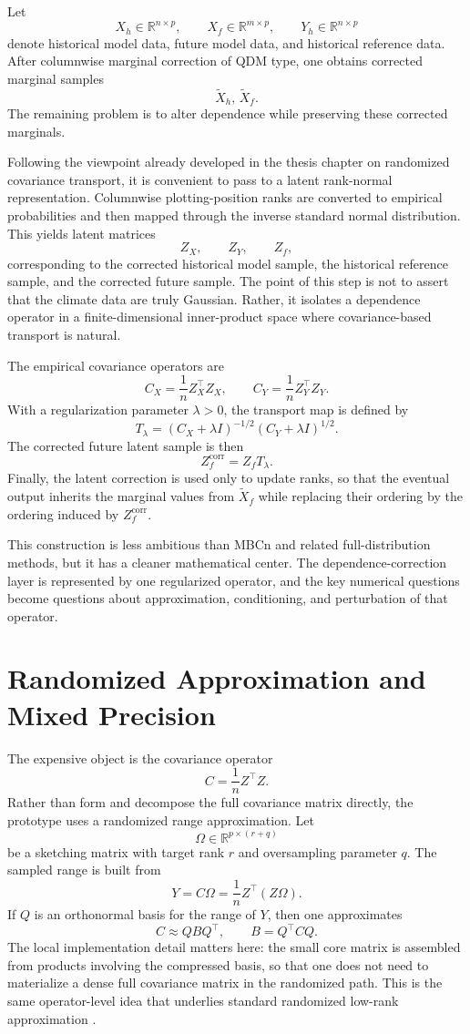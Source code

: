 \documentclass[12pt,a4paper]{article}
\newcommand{\R}{\mathbb{R}}
\begin{document}
Let
\[
	X_h \in \R^{n \times p}, \qquad X_f \in \R^{m \times p}, \qquad Y_h \in \R^{n \times p}
\]
denote historical model data, future model data, and historical reference data. After columnwise marginal correction of QDM type, one obtains corrected marginal samples
\[
	\widetilde X_h,\, \widetilde X_f.
\]
The remaining problem is to alter dependence while preserving these corrected marginals.

Following the viewpoint already developed in the thesis chapter on randomized covariance transport, it is convenient to pass to a latent rank-normal representation. Columnwise plotting-position ranks are converted to empirical probabilities and then mapped through the inverse standard normal distribution. This yields latent matrices
\[
	Z_X, \qquad Z_Y, \qquad Z_f,
\]
corresponding to the corrected historical model sample, the historical reference sample, and the corrected future sample. The point of this step is not to assert that the climate data are truly Gaussian. Rather, it isolates a dependence operator in a finite-dimensional inner-product space where covariance-based transport is natural.

The empirical covariance operators are
\[
	C_X = \frac{1}{n} Z_X^\top Z_X,
	\qquad
	C_Y = \frac{1}{n} Z_Y^\top Z_Y.
\]
With a regularization parameter $\lambda > 0$, the transport map is defined by
\[
	T_\lambda = (C_X + \lambda I)^{-1/2}(C_Y + \lambda I)^{1/2}.
\]
The corrected future latent sample is then
\[
	Z_f^{\mathrm{corr}} = Z_f T_\lambda.
\]
Finally, the latent correction is used only to update ranks, so that the eventual output inherits the marginal values from $\widetilde X_f$ while replacing their ordering by the ordering induced by $Z_f^{\mathrm{corr}}$.

This construction is less ambitious than MBCn and related full-distribution methods, but it has a cleaner mathematical center. The dependence-correction layer is represented by one regularized operator, and the key numerical questions become questions about approximation, conditioning, and perturbation of that operator.

\section{Randomized Approximation and Mixed Precision}

The expensive object is the covariance operator
\[
	C = \frac{1}{n} Z^\top Z.
\]
Rather than form and decompose the full covariance matrix directly, the prototype uses a randomized range approximation. Let
\[
	\Omega \in \R^{p \times (r+q)}
\]
be a sketching matrix with target rank $r$ and oversampling parameter $q$. The sampled range is built from
\[
	Y = C\Omega = \frac{1}{n} Z^\top(Z\Omega).
\]
If $Q$ is an orthonormal basis for the range of $Y$, then one approximates
\[
	C \approx QBQ^\top,
	\qquad
	B = Q^\top C Q.
\]
The local implementation detail matters here: the small core matrix is assembled from products involving the compressed basis, so that one does not need to materialize a dense full covariance matrix in the randomized path. This is the same operator-level idea that underlies standard randomized low-rank approximation \cite{halko2011finding,martinsson2020randnla}.
\end{document}
